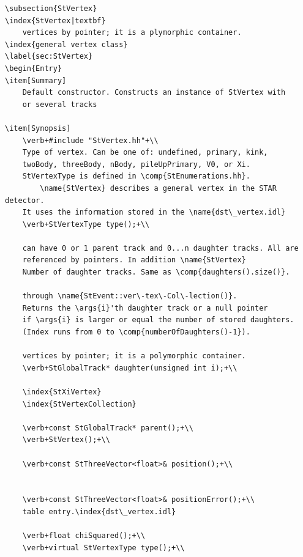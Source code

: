 \begin{Entry}
\begin{Entry}
{\begin{verbatim}
\subsection{StVertex}
\index{StVertex|textbf}
    vertices by pointer; it is a plymorphic container.
\index{general vertex class}
\label{sec:StVertex}
\begin{Entry}
\item[Summary]
    Default constructor. Constructs an instance of StVertex with
    or several tracks

\item[Synopsis]
    \verb+#include "StVertex.hh"+\\
    Type of vertex. Can be one of: undefined, primary, kink,
    twoBody, threeBody, nBody, pileUpPrimary, V0, or Xi.
    StVertexType is defined in \comp{StEnumerations.hh}.
        \name{StVertex} describes a general vertex in the STAR detector.
    It uses the information stored in the \name{dst\_vertex.idl}
    \verb+StVertexType type();+\\
    
    can have 0 or 1 parent track and 0...n daughter tracks. All are
    referenced by pointers. In addition \name{StVertex}
    Number of daughter tracks. Same as \comp{daughters().size()}.
    
    through \name{StEvent::ver\-tex\-Col\-lection()}.
    Returns the \args{i}'th daughter track or a null pointer
    if \args{i} is larger or equal the number of stored daughters.
    (Index runs from 0 to \comp{numberOfDaughters()-1}).

    vertices by pointer; it is a polymorphic container.
    \verb+StGlobalTrack* daughter(unsigned int i);+\\
    
    \index{StXiVertex}
    \index{StVertexCollection}
    
    \verb+const StGlobalTrack* parent();+\\
    \verb+StVertex();+\\
    
    \verb+const StThreeVector<float>& position();+\\

    
    \verb+const StThreeVector<float>& positionError();+\\
    table entry.\index{dst\_vertex.idl}
    
    \verb+float chiSquared();+\\        
    \verb+virtual StVertexType type();+\\
    

\end{verbatim}}
\end{Entry}
\end{Entry}
